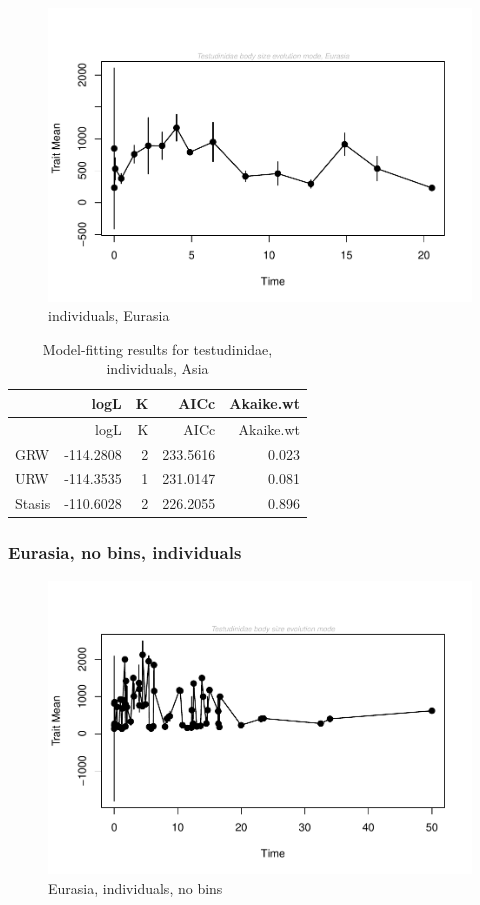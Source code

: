 \documentclass[]{article}
\begin{document}
\begin{figure}[htbp]
\centering
\includegraphics{MA_JJ_files/figure-latex/paleoTS, individuals, Eurasia-1.pdf}
\caption{individuals, Eurasia}
\end{figure}

\begin{longtable}[]{@{}lrrrr@{}}
\caption{Model-fitting results for testudinidae, individuals,
Asia}\tabularnewline
\toprule
& logL & K & AICc & Akaike.wt\tabularnewline
\midrule
\endfirsthead
\toprule
& logL & K & AICc & Akaike.wt\tabularnewline
\midrule
\endhead
GRW & -114.2808 & 2 & 233.5616 & 0.023\tabularnewline
URW & -114.3535 & 1 & 231.0147 & 0.081\tabularnewline
Stasis & -110.6028 & 2 & 226.2055 & 0.896\tabularnewline
\bottomrule
\end{longtable}

\newpage

\subsubsection{Eurasia, no bins,
individuals}\label{eurasia-no-bins-individuals}

\begin{figure}[htbp]
\centering
\includegraphics{MA_JJ_files/figure-latex/paleoTS, no bins individuals, Eurasia-1.pdf}
\caption{Eurasia, individuals, no bins}
\end{figure}
\end{document}

